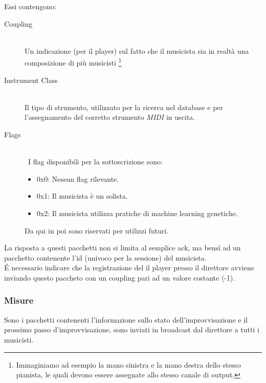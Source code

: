 Essi contengono:
\begin{description}
\item[Coupling] \hfill \\
Un indicazione (per il player) sul fatto che il musicista sia in realtà una
composizione di più musicisti
\footnote{Immaginiamo ad esempio la mano sinistra e la mano destra dello
	  stesso pianista, le quali devono essere assegnate allo stesso
	  canale di output.}
\item[Instrument Class] \hfill \\
Il tipo di strumento, utilizzato per la ricerca nel database e per l'assegnamento
del corretto strumento \emph{MIDI} in uscita.
\item[Flags] \hfill \\\
I flag disponibili per la sottoscrizione sono:
\begin{itemize}
\item 0x0: Nessun flag rilevante.\\
\item 0x1: Il musicista è un solista.\\
\item 0x2: Il musicista utilizza pratiche di machine learning genetiche.\\
\end{itemize}
Da qui in poi sono riservati per utilizzi futuri.
\end{description}

La risposta a questi pacchetti non si limita al semplice ack, ma bensì ad
un pacchetto contenente l'id (univoco per la sessione) del musicista.\\

\'E necessario indicare che la registrazione del il player presso il direttore
avviene inviando questo paccheto con un coupling pari ad un valore costante
(-1).

\subsubsection{Misure}
Sono i pacchetti contenenti l'informazione sullo stato dell'improvvisazione
e il prossimo passo d'improvvisazione, sono inviati in broadcast dal direttore
a tutti i musicisti.

